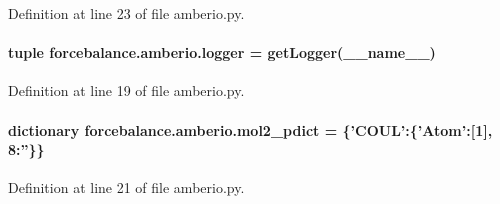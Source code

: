 Definition at line 23 of file amberio.\-py.

\hypertarget{namespaceforcebalance_1_1amberio_a83e0daca87d51461c74be86337502ed5}{
\paragraph[{logger}]{\setlength{\rightskip}{0pt plus 5cm}tuple forcebalance.\-amberio.\-logger = get\-Logger(\-\_\-\-\_\-name\-\_\-\-\_\-)}}\label{namespaceforcebalance_1_1amberio_a83e0daca87d51461c74be86337502ed5}


Definition at line 19 of file amberio.\-py.

\hypertarget{namespaceforcebalance_1_1amberio_a84f51a0ccf50d3442cefb90f948653b0}{
\paragraph[{mol2\-\_\-pdict}]{\setlength{\rightskip}{0pt plus 5cm}dictionary forcebalance.\-amberio.\-mol2\-\_\-pdict = \{'C\-O\-U\-L'\-:\{'Atom'\-:\mbox{[}1\mbox{]}, 8\-:''\}\}}}\label{namespaceforcebalance_1_1amberio_a84f51a0ccf50d3442cefb90f948653b0}


Definition at line 21 of file amberio.\-py.


